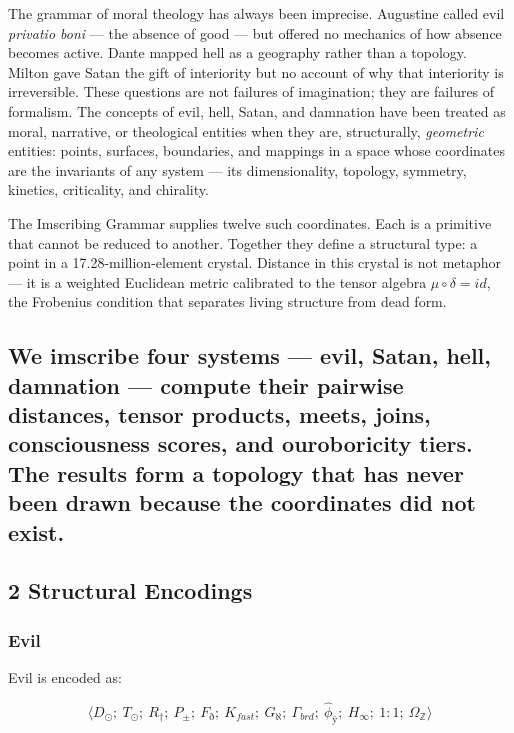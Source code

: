 \documentclass[12pt,a4paper]{article}
\begin{document}
The grammar of moral theology has always been imprecise. Augustine called evil \emph{privatio boni} --- the absence of good --- but offered no mechanics of how absence becomes active. Dante mapped hell as a geography rather than a topology. Milton gave Satan the gift of interiority but no account of why that interiority is irreversible. These questions are not failures of imagination; they are failures of formalism. The concepts of evil, hell, Satan, and damnation have been treated as moral, narrative, or theological entities when they are, structurally, \emph{geometric} entities: points, surfaces, boundaries, and mappings in a space whose coordinates are the invariants of any system --- its dimensionality, topology, symmetry, kinetics, criticality, and chirality.

The Imscribing Grammar supplies twelve such coordinates. Each is a primitive that cannot be reduced to another. Together they define a structural type: a point in a 17.28-million-element crystal. Distance in this crystal is not metaphor --- it is a weighted Euclidean metric calibrated to the tensor algebra $\mu \circ \delta = {id}$, the Frobenius condition that separates living structure from dead form.

\subsection{We imscribe four systems --- evil, Satan, hell, damnation --- compute their pairwise distances, tensor products, meets, joins, consciousness scores, and ouroboricity tiers. The results form a topology that has never been drawn because the coordinates did not exist.}

\subsection{2 Structural Encodings}

\subsubsection{Evil}

Evil is encoded as:


\[\langle D_{\odot};\ T_{\odot};\ R_{\dagger};\ P_{\pm};\ F_{\eth};\ K_{fast};\ G_{\aleph};\ \Gamma_{brd};\ \hat{\phi}_{ÿ};\ H_{\infty};\ 1{:}1;\ \Omega_{\mathbb{Z}} \rangle\]
\end{document}

